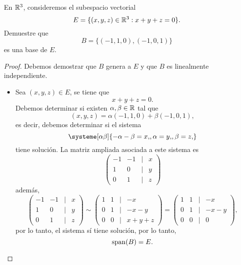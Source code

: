 \documentclass[a4,11pt]{aleph-notas}
\begin{document}
\encabezado

\begin{ejer}
    En $\mathbb{R}^3$, consideremos el subespacio vectorial
    \[
        E = \{(x,y,z)\in \mathbb{R}^3 : x+y+z=0 \}.
    \]
    Demuestre que 
    \[
        B = \{(-1,1,0) , (-1,0,1)\}
    \]
    es una base de $E$.
\end{ejer}

\begin{proof}
    Debemos demostrar que $B$ genera a $E$ y que $B$ es linealmente independiente.
    \begin{itemize}[leftmargin=*]
    \item
        Sea $(x,y,z)\in E$, se tiene que
        \[
            x+y+z=0.
        \]
        Debemos determinar si existen $\alpha,\beta\in\mathbb{R}$ tal que
        \[
            (x,y,z) = \alpha(-1,1,0)+\beta(-1,0,1),
        \]
        es decir, debemos determinar si el sistema
        \[
            \systeme[\alpha\beta]{
                -\alpha-\beta = x{,},
                \alpha = y{,},
                \beta = z{,}
            }
        \]
        tiene solución. La matriz ampliada asociada a este sistema es
        \[
            \begin{pmatrix}
                -1 & -1 & | & x\\
                1 & 0 & | & y\\
                0 & 1 & | & z
            \end{pmatrix}
        \]
        además,
        \[
            \begin{pmatrix}
                -1 & -1 & | & x\\
                1 & 0 & | & y\\
                0 & 1 & | & z
            \end{pmatrix}
            \sim
            \begin{pmatrix}
                1 & 1 & | & -x\\
                0 & 1 & | & -x-y\\
                0 & 0 & | & x+y+z
            \end{pmatrix}
            =
            \begin{pmatrix}
                1 & 1 & | & -x\\
                0 & 1 & | & -x-y\\
                0 & 0 & | & 0
            \end{pmatrix},
        \]
        por lo tanto, el sistema sí tiene solución, por lo tanto, 
        \[
            \operatorname{span}(B) = E.
\]
\end{itemize}
\end{proof}
\end{document}
